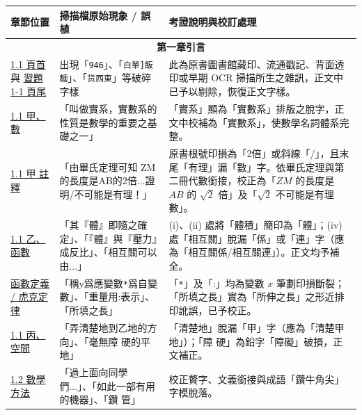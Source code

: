 \documentclass[a4paper,12pt,twoside]{article}
\begin{document}
\begin{table}[H]
\centering
\small
\renewcommand{\arraystretch}{1.35}
\begin{tabularx}{\textwidth}{|p{3.0cm}|p{3.8cm}|X|}
\hline
\textbf{章節位置} & \textbf{掃描檔原始現象 / 誤植} & \textbf{考證說明與校訂處理} \\ \hline

\multicolumn{3}{|c|}{\textbf{第一章\quad 引言}} \\ \hline

\hyperref[sec:1-1]{1.1 頁首} 與 \hyperref[sec:ex1-1]{習題 1-1 頁尾} & 
出現「\texttt{946}」、「\texttt{白單]飯麵}」、「\texttt{货西東}」等破碎字樣 & 
此為原書圖書館藏印、流通戳記、背面透印或早期 OCR 掃描所生之雜訊，正文中已予以剔除，恢復正文字樣。 \\ \hline

\hyperref[subsec:number]{1.1 甲、數} & 
「叫做實系，實數系的性質是數學的重要之基礎之一」 & 
「實系」顯為「實數系」排版之脫字，正文中校補為「實數系」，使數學名詞體系完整。 \\ \hline

\hyperref[fn:sqrt2]{1.1 甲 註釋} & 
「由畢氏定理可知 ZM的長度是AB的2倍...證明/不可能是有理！」 & 
原書根號印損為「2倍」或斜線「/」，且末尾「有理」漏「數」字。依畢氏定理與第二冊代數銜接，校正為「$ZM$ 的長度是 $AB$ 的 $\sqrt{2}$ 倍」及「$\sqrt{2}$ 不可能是有理數」。 \\ \hline

\hyperref[subsec:function]{1.1 乙、函數} & 
「其『體』即隨之確定」、「『體』與『壓力』成反比」、「相互關可以由...」 & 
(i)、(ii) 處將「體積」簡印為「體」；(iv) 處「相互關」脫漏「係」或「連」字（應為「相互關係/相互關連」）。正文均予補全。 \\ \hline

\hyperref[def:function]{函數定義 / 虎克定律} & 
「稱y爲應變數\texttt{*}爲自變數」、「重量用:表示」、「所填之長」 & 
「\texttt{*}」及「:」均為變數 $x$ 筆劃印損斷裂；「所填之長」實為「所伸之長」之形近排印訛誤，已予校正。 \\ \hline

\hyperref[subsec:space]{1.1 丙、空間} & 
「弄清楚地到乙地的方向」、「毫無障 硬的平地」 & 
「清楚地」脫漏「甲」字（應為「清楚甲地」）；「障 硬」為鉛字「障礙」破損，正文補正。 \\ \hline

\hyperref[sec:1-2]{1.2 數學方法} & 
「過上面向同學們...」、「如此一部有用的機器」、「鑽 管」 & 
校正贅字、文義銜接與成語「鑽牛角尖」字模脫落。 \\ \hline


\end{tabularx}
\end{table}
\end{document}
